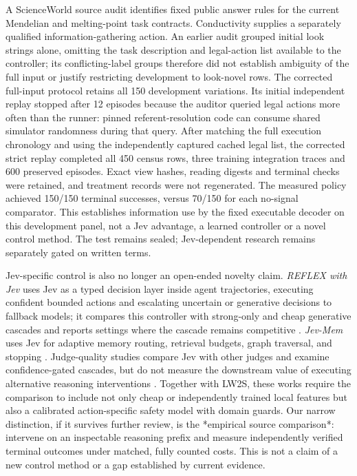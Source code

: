 \documentclass[11pt]{article}
\begin{document}
A ScienceWorld source audit identifies fixed public answer rules for the current Mendelian and melting-point task contracts. Conductivity supplies a separately qualified information-gathering action. An earlier audit grouped initial look strings alone, omitting the task description and legal-action list available to the controller; its conflicting-label groups therefore did not establish ambiguity of the full input or justify restricting development to look-novel rows. The corrected full-input protocol retains all 150 development variations. Its initial independent replay stopped after 12 episodes because the auditor queried legal actions more often than the runner: pinned referent-resolution code can consume shared simulator randomness during that query. After matching the full execution chronology and using the independently captured cached legal list, the corrected strict replay completed all 450 census rows, three training integration traces and 600 preserved episodes. Exact view hashes, reading digests and terminal checks were retained, and treatment records were not regenerated. The measured policy achieved 150/150 terminal successes, versus 70/150 for each no-signal comparator. This establishes information use by the fixed executable decoder on this development panel, not a Jev advantage, a learned controller or a novel control method. The test remains sealed; Jev-dependent research remains separately gated on written terms.

Jev-specific control is also no longer an open-ended novelty claim. \emph{REFLEX with Jev} uses Jev as a typed decision layer inside agent trajectories, executing confident bounded actions and escalating uncertain or generative decisions to fallback models; it compares this controller with strong-only and cheap generative cascades and reports settings where the cascade remains competitive \cite{reflexjev}. \emph{Jev-Mem} uses Jev for adaptive memory routing, retrieval budgets, graph traversal, and stopping \cite{jevmem}. Judge-quality studies compare Jev with other judges and examine confidence-gated cascades, but do not measure the downstream value of executing alternative reasoning interventions \cite{jevjudge,jevjudges}. Together with LW2S, these works require the comparison to include not only cheap or independently trained local features but also a calibrated action-specific safety model with domain guards. Our narrow distinction, if it survives further review, is the *empirical source comparison*: intervene on an inspectable reasoning prefix and measure independently verified terminal outcomes under matched, fully counted costs. This is not a claim of a new control method or a gap established by current evidence.
\end{document}
